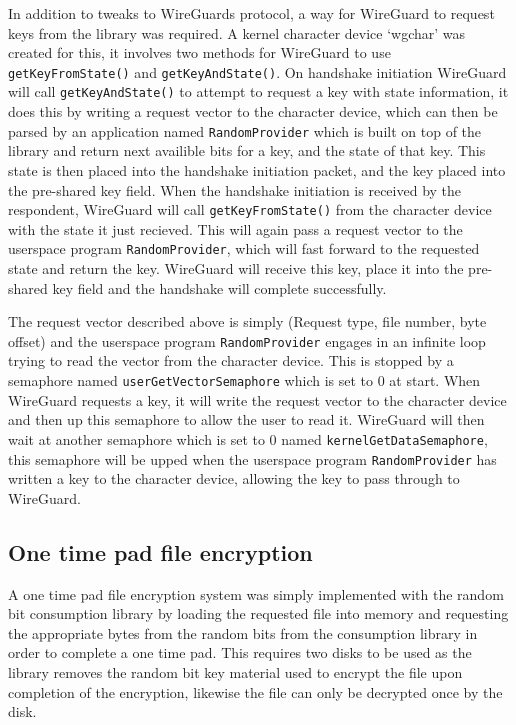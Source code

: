 \documentclass{paper}
\begin{document}
				In addition to tweaks to WireGuards protocol, a way for WireGuard to request keys from the library was required. A kernel character device `wgchar' was created for this, it involves two methods for WireGuard to use \texttt{getKeyFromState()} and \texttt{getKeyAndState()}. On handshake initiation WireGuard will call \texttt{getKeyAndState()} to attempt to request a key with state information, it does this by writing a request vector to the character device, which can then be parsed by an application named \texttt{RandomProvider} which is built on top of the library and return next availible bits for a key, and the state of that key. This state is then placed into the handshake initiation packet, and the key placed into the pre-shared key field. When the handshake initiation is received by the respondent, WireGuard will call \texttt{getKeyFromState()} from the character device with the state it just recieved. This will again pass a request vector to the userspace program \texttt{RandomProvider}, which will fast forward to the requested state and return the key. WireGuard will receive this key, place it into the pre-shared key field and the handshake will complete successfully.
				
				The request vector described above is simply (Request type, file number, byte offset) and the userspace program \texttt{RandomProvider} engages in an infinite loop trying to read the vector from the character device. This is stopped by a semaphore named \texttt{userGetVectorSemaphore} which is set to 0 at start. When WireGuard requests a key, it will write the request vector to the character device and then up this semaphore to allow the user to read it. WireGuard will then wait at another semaphore which is set to 0 named \texttt{kernelGetDataSemaphore}, this semaphore will be upped when the userspace program \texttt{RandomProvider} has written a key to the character device, allowing the key to pass through to WireGuard. 
				
			\subsection{One time pad file encryption}
				A one time pad file encryption system was simply implemented with the random bit consumption library by loading the requested file into memory and requesting the appropriate bytes from the random bits from the consumption library in order to complete a one time pad. This requires two disks to be used as the library removes the random bit key material used to encrypt the file upon completion of the encryption, likewise the file can only be decrypted once by the disk.
				
\end{document}
